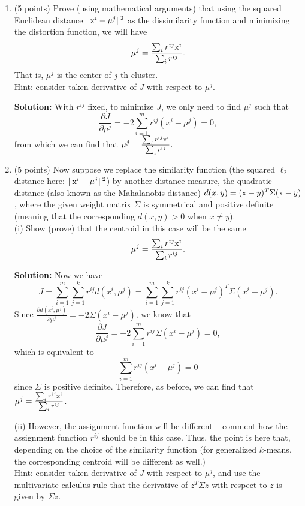 \documentclass[twoside,10pt]{article}
\begin{document}
\begin{enumerate}

\item (5 points) Prove (using mathematical arguments) that using the squared Euclidean distance $\|\text x^i-\mu^j\|^2$ as the dissimilarity function and minimizing the distortion function, we will have 
   $$\mu^j=\frac{\sum_i r^{ij} \text x^i}{\sum_i r^{ij}}.$$
   That is, $\mu^j$ is the center of $j$-th cluster.  \\
   Hint: consider taken derivative of $J$ with respect to $\mu^j$.\\
   \begin{tcolorbox}
   \textbf{Solution:} With $r^{ij}$ fixed, to minimize $J$, we only need to find $\mu^j$ such that
   $$\frac{\partial{J}}{\partial{\mu^j}} = -2\sum_{i=1}^{m}r^{ij}(x^i-\mu^j) = 0,$$ 
   from which we can find that $\mu^j=\frac{\sum_i r^{ij} \text x^i}{\sum_i r^{ij}}.$  
   \end{tcolorbox}
   
   
   \item (5 points) Now suppose we replace the similarity function (the squared $\ell_2$ distance here: $\|\text x^i-\mu^j\|^2$) by another distance measure, the quadratic distance (also known as the Mahalanobis distance) $d(x, y) = (\text x - y)^T \Sigma  (\text x - y)$, where the given weight matrix $\Sigma$ is symmetrical and positive definite (meaning that the corresponding $d(x, y) > 0$ when $x \neq y$).\\
   (i) Show (prove) that the centroid in this case will be the same
   $$\mu^j=\frac{\sum_i r^{ij} \text x^i}{\sum_i r^{ij}}.$$
   \begin{tcolorbox}
   \textbf{Solution:} Now we have 
   $$J = \sum_{i=1}^m\sum_{j=1}^k r^{ij}d(x^i,{\mu}^j) = \sum_{i=1}^m\sum_{j=1}^k r^{ij}(x^i-{\mu}^j)^T\Sigma(x^i-{\mu}^j).$$ 
   Since $\frac{\partial d(x^i,{\mu}^j)}{\partial{\mu}^j} = -2\Sigma(x^i-{\mu}^j)$, we know that
   $$\frac{\partial{J}}{\partial{{\mu}^j}} = -2\sum_{i=1}^{m}r^{ij}\Sigma(x^i-{\mu}^j) = 0,$$
   which is equivalent to $$\sum_{i=1}^{m}r^{ij}(x^i-{\mu}^j) = 0$$ since $\Sigma$ is positive definite. Therefore, as before, we can find that ${\mu}^j= \frac{\sum_i r^{ij} \text x^i}{\sum_i r^{ij}}$. 
   \end{tcolorbox}
   
   
   (ii) However, the assignment function will be different -- comment how the assignment function $r^{ij}$ should be in this case. 
   Thus, the point is here that, depending on the choice of the similarity function (for generalized $k$-means, the corresponding centroid will be different as well.) \\
   Hint: consider taken derivative of $J$ with respect to $\mu^j$, and use the multivariate calculus rule that the derivative of $z^T \Sigma z$ with respect to $z$ is given by $\Sigma z$. 
   

\end{enumerate}
\end{document}
